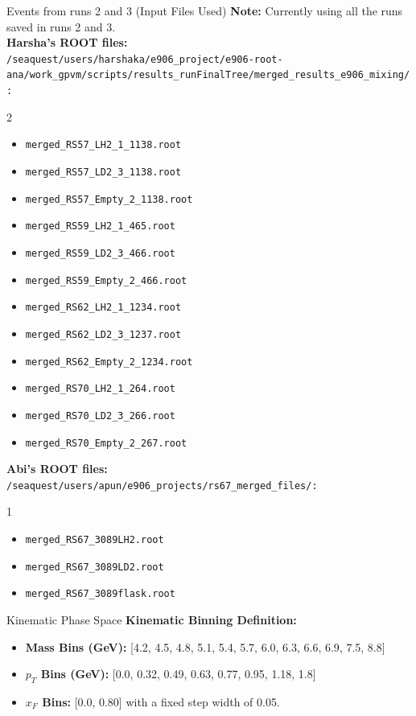 \documentclass[aspectratio=169]{beamer}
\begin{document}
\begin{frame}{Events from runs 2 and 3 (Input Files Used)}
\textbf{Note:} Currently using all the runs saved in runs 2 and 3.
\vspace{0.3cm}
\tiny\\
\textbf{Harsha's ROOT files:} \\
\texttt{/seaquest/users/harshaka/e906\_project/e906-root-ana/work\_gpvm/scripts/results\_runFinalTree/merged\_results\_e906\_mixing/:}
\begin{multicols}{2}
\begin{itemize}
    \item \texttt{merged\_RS57\_LH2\_1\_1138.root}
    \item \texttt{merged\_RS57\_LD2\_3\_1138.root}
    \item \texttt{merged\_RS57\_Empty\_2\_1138.root}
    \item \texttt{merged\_RS59\_LH2\_1\_465.root}
    \item \texttt{merged\_RS59\_LD2\_3\_466.root}
    \item \texttt{merged\_RS59\_Empty\_2\_466.root}
    \item \texttt{merged\_RS62\_LH2\_1\_1234.root}
    \item \texttt{merged\_RS62\_LD2\_3\_1237.root}
    \item \texttt{merged\_RS62\_Empty\_2\_1234.root}
    \item \texttt{merged\_RS70\_LH2\_1\_264.root}
    \item \texttt{merged\_RS70\_LD2\_3\_266.root}
    \item \texttt{merged\_RS70\_Empty\_2\_267.root}
\end{itemize}
\end{multicols}
\textbf{Abi's ROOT files:} \\
\texttt{/seaquest/users/apun/e906\_projects/rs67\_merged\_files/:}
\begin{multicols}{1}
\begin{itemize}
    \item \texttt{merged\_RS67\_3089LH2.root}
    \item \texttt{merged\_RS67\_3089LD2.root}
    \item \texttt{merged\_RS67\_3089flask.root}
\end{itemize}
\end{multicols}

\normalsize
\end{frame}
\begin{frame}{Kinematic Phase Space}
\textbf{Kinematic Binning Definition:}
\begin{itemize}
    \item \textbf{Mass Bins (GeV):} [4.2, 4.5, 4.8, 5.1, 5.4, 5.7, 6.0, 6.3, 6.6, 6.9, 7.5, 8.8]
    \item \textbf{$p_T$ Bins (GeV):} [0.0, 0.32, 0.49, 0.63, 0.77, 0.95, 1.18, 1.8]
    \item \textbf{$x_F$ Bins:} [0.0, 0.80] with a fixed step width of 0.05.
\end{itemize}
\end{frame}
\end{document}

